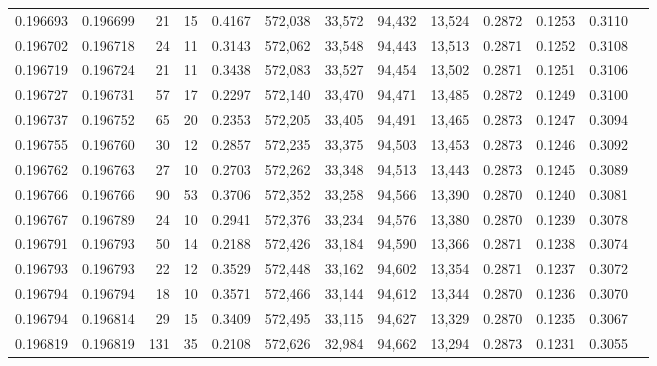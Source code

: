 \begin{tabular}{rrrrrrrrrrrrr}
0.196693 & 0.196699 &    21 &  15 &                                     0.4167 & 572,038 &  33,572 &  94,432 &  13,524 & 0.2872 & 0.1253 & 0.3110 \\
0.196702 & 0.196718 &    24 &  11 &                                     0.3143 & 572,062 &  33,548 &  94,443 &  13,513 & 0.2871 & 0.1252 & 0.3108 \\
0.196719 & 0.196724 &    21 &  11 &                                     0.3438 & 572,083 &  33,527 &  94,454 &  13,502 & 0.2871 & 0.1251 & 0.3106 \\
0.196727 & 0.196731 &    57 &  17 &                                     0.2297 & 572,140 &  33,470 &  94,471 &  13,485 & 0.2872 & 0.1249 & 0.3100 \\
0.196737 & 0.196752 &    65 &  20 &                                     0.2353 & 572,205 &  33,405 &  94,491 &  13,465 & 0.2873 & 0.1247 & 0.3094 \\
0.196755 & 0.196760 &    30 &  12 &                                     0.2857 & 572,235 &  33,375 &  94,503 &  13,453 & 0.2873 & 0.1246 & 0.3092 \\
0.196762 & 0.196763 &    27 &  10 &                                     0.2703 & 572,262 &  33,348 &  94,513 &  13,443 & 0.2873 & 0.1245 & 0.3089 \\
0.196766 & 0.196766 &    90 &  53 &                                     0.3706 & 572,352 &  33,258 &  94,566 &  13,390 & 0.2870 & 0.1240 & 0.3081 \\
0.196767 & 0.196789 &    24 &  10 &                                     0.2941 & 572,376 &  33,234 &  94,576 &  13,380 & 0.2870 & 0.1239 & 0.3078 \\
0.196791 & 0.196793 &    50 &  14 &                                     0.2188 & 572,426 &  33,184 &  94,590 &  13,366 & 0.2871 & 0.1238 & 0.3074 \\
0.196793 & 0.196793 &    22 &  12 &                                     0.3529 & 572,448 &  33,162 &  94,602 &  13,354 & 0.2871 & 0.1237 & 0.3072 \\
0.196794 & 0.196794 &    18 &  10 &                                     0.3571 & 572,466 &  33,144 &  94,612 &  13,344 & 0.2870 & 0.1236 & 0.3070 \\
0.196794 & 0.196814 &    29 &  15 &                                     0.3409 & 572,495 &  33,115 &  94,627 &  13,329 & 0.2870 & 0.1235 & 0.3067 \\
0.196819 & 0.196819 &   131 &  35 &                                     0.2108 & 572,626 &  32,984 &  94,662 &  13,294 & 0.2873 & 0.1231 & 0.3055 \\

\end{tabular}
